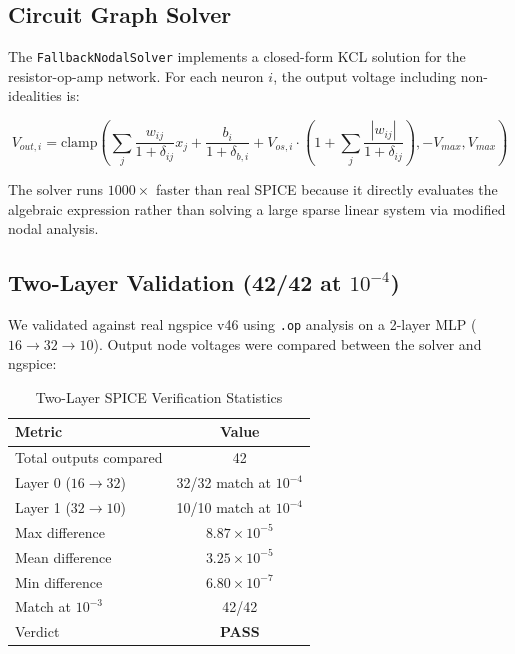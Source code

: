 \documentclass[10pt,twocolumn]{article}
\begin{document}
\subsection{Circuit Graph Solver}

The \texttt{FallbackNodalSolver} implements a closed-form KCL solution for the resistor-op-amp network. For each neuron $i$, the output voltage including non-idealities is:

\begin{equation}
V_{out,i} = \text{clamp}\left( \sum_j \frac{w_{ij}}{1 + \delta_{ij}} x_j + \frac{b_i}{1 + \delta_{b,i}} + V_{os,i} \cdot \left(1 + \sum_j \frac{|w_{ij}|}{1 + \delta_{ij}}\right), -V_{max}, V_{max} \right)
\end{equation}

The solver runs $1000\times$ faster than real SPICE because it directly evaluates the algebraic expression rather than solving a large sparse linear system via modified nodal analysis.

\subsection{Two-Layer Validation (42/42 at $10^{-4}$)}

We validated against real ngspice v46 using \texttt{.op} analysis on a 2-layer MLP ($16 \to 32 \to 10$). Output node voltages were compared between the solver and ngspice:

\begin{table}[t]
  \centering
  \caption{Two-Layer SPICE Verification Statistics}
  \label{tab:spice2}
  \begin{tabular}{lc}
    \toprule
    Metric & Value \\
    \midrule
    Total outputs compared & 42 \\
    Layer 0 ($16 \to 32$) & 32/32 match at $10^{-4}$ \\
    Layer 1 ($32 \to 10$) & 10/10 match at $10^{-4}$ \\
    Max difference & $8.87 \times 10^{-5}$ \\
    Mean difference & $3.25 \times 10^{-5}$ \\
    Min difference & $6.80 \times 10^{-7}$ \\
    Match at $10^{-3}$ & 42/42 \\
    Verdict & \textbf{PASS} \\
    \bottomrule
  \end{tabular}
\end{table}
\end{document}
